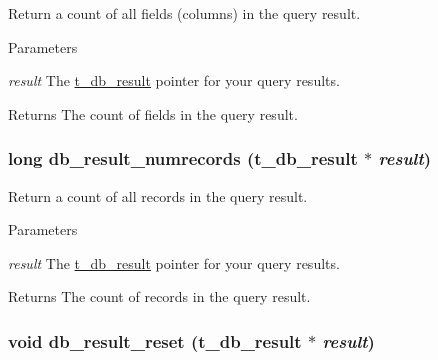 Return a count of all fields (columns) in the query result. 
\begin{DoxyParams}{Parameters}
\item[{\em result}]The \hyperlink{group__database_gae34db00cb98960e94b5ca58a7c21c362}{t\_\-db\_\-result} pointer for your query results. \end{DoxyParams}
\begin{DoxyReturn}{Returns}
The count of fields in the query result. 
\end{DoxyReturn}
\hypertarget{group__database_gad5e17d5d9a14aa7a156ca508cf12eb3d}{
\subsubsection[{db\_\-result\_\-numrecords}]{\setlength{\rightskip}{0pt plus 5cm}long db\_\-result\_\-numrecords ({\bf t\_\-db\_\-result} $\ast$ {\em result})}}
\label{group__database_gad5e17d5d9a14aa7a156ca508cf12eb3d}


Return a count of all records in the query result. 
\begin{DoxyParams}{Parameters}
\item[{\em result}]The \hyperlink{group__database_gae34db00cb98960e94b5ca58a7c21c362}{t\_\-db\_\-result} pointer for your query results. \end{DoxyParams}
\begin{DoxyReturn}{Returns}
The count of records in the query result. 
\end{DoxyReturn}
\hypertarget{group__database_gad0d384ab3ba04958d982cede2cffa043}{
\subsubsection[{db\_\-result\_\-reset}]{\setlength{\rightskip}{0pt plus 5cm}void db\_\-result\_\-reset ({\bf t\_\-db\_\-result} $\ast$ {\em result})}}
\label{group__database_gad0d384ab3ba04958d982cede2cffa043}


